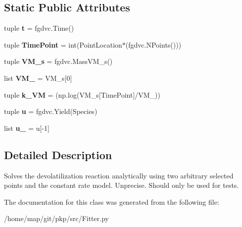\subsection*{\-Static \-Public \-Attributes}
\begin{DoxyCompactItemize}
\item 
\hypertarget{classFitter_1_1TwoPointEstimator_acaedd1a44428e8d97bc109946e7334e4}{tuple {\bfseries t} = fgdvc.\-Time()}\label{classFitter_1_1TwoPointEstimator_acaedd1a44428e8d97bc109946e7334e4}

\item 
\hypertarget{classFitter_1_1TwoPointEstimator_a4394dafc36ec5b7a2555ded2a06b5a3b}{tuple {\bfseries \-Time\-Point} = int(\-Point\-Location$\ast$(fgdvc.\-N\-Points()))}\label{classFitter_1_1TwoPointEstimator_a4394dafc36ec5b7a2555ded2a06b5a3b}

\item 
\hypertarget{classFitter_1_1TwoPointEstimator_a7e2d9cfac4ed0e60e439bc682406a11d}{tuple {\bfseries \-V\-M\-\_\-s} = fgdvc.\-Mass\-V\-M\-\_\-s()}\label{classFitter_1_1TwoPointEstimator_a7e2d9cfac4ed0e60e439bc682406a11d}

\item 
\hypertarget{classFitter_1_1TwoPointEstimator_ac1eff0e06936424b0a7bbbd651a23b89}{list {\bfseries \-V\-M\-\_} = \-V\-M\-\_\-s\mbox{[}0\mbox{]}}\label{classFitter_1_1TwoPointEstimator_ac1eff0e06936424b0a7bbbd651a23b89}

\item 
\hypertarget{classFitter_1_1TwoPointEstimator_abcfe43524bdecfa3fa0f9aea32ee72bc}{tuple {\bfseries k\-\_\-\-V\-M} = (np.\-log(\-V\-M\-\_\-s\mbox{[}\-Time\-Point\mbox{]}/\-V\-M\-\_))}\label{classFitter_1_1TwoPointEstimator_abcfe43524bdecfa3fa0f9aea32ee72bc}

\item 
\hypertarget{classFitter_1_1TwoPointEstimator_ac9e2b04abd40aeca19dc2b3dfd9d7661}{tuple {\bfseries u} = fgdvc.\-Yield(\-Species)}\label{classFitter_1_1TwoPointEstimator_ac9e2b04abd40aeca19dc2b3dfd9d7661}

\item 
\hypertarget{classFitter_1_1TwoPointEstimator_a4680babf00753d73e67b22b0dc7dba34}{list {\bfseries u\-\_} = u\mbox{[}-\/1\mbox{]}}\label{classFitter_1_1TwoPointEstimator_a4680babf00753d73e67b22b0dc7dba34}

\end{DoxyCompactItemize}


\subsection{\-Detailed \-Description}
\begin{DoxyVerb}Solves the devolatilization reaction analytically using two arbitrary selected points and the constant rate model. Unprecise. Should only be used for tests.\end{DoxyVerb}
 

\-The documentation for this class was generated from the following file\-:\begin{DoxyCompactItemize}
\item 
/home/map/git/pkp/src/\-Fitter.\-py\end{DoxyCompactItemize}
